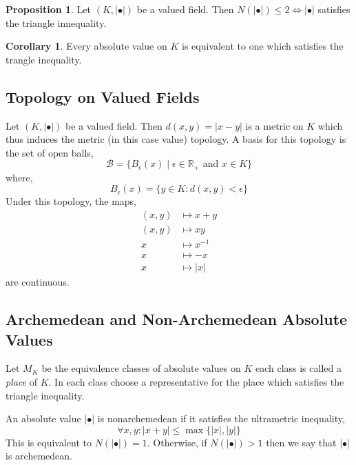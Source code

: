 \documentclass[12pt]{extarticle}
\newcommand{\R}{\mathbb{R}}
\theoremstyle{definition}
\newtheorem{proposition}[theorem]{Proposition}
\newtheorem{corollary}[theorem]{Corollary}
\newenvironment{definition}[1][Definition:]{\begin{trivlist}
\item[\hskip \labelsep {\bfseries #1}]}{\end{trivlist}}
\begin{document}
\begin{proposition}
Let $(K, |\bullet|)$ be a valued field. Then $N(| \bullet |) \le 2 \iff | \bullet |$ satisfies the triangle innequality.
\end{proposition}

\begin{corollary}
Every absolute value on $K$ is equivalent to one which satisfies the trangle inequality. 
\end{corollary}

\subsection{Topology on Valued Fields}

\begin{definition}
Let $(K, | \bullet |)$ be a valued field. Then $d(x, y) = | x - y|$ is a metric on $K$ which thus induces the metric (in this case value) topology. A basis for this topology is the set of open balls,
\[ \mathcal{B} = \{ B_\epsilon(x) \mid \epsilon \in \R_{+} \text{ and } x \in K \} \]
where,
\[ B_\epsilon(x) = \{ y \in K : d(x, y) < \epsilon \} \]
Under this topology, the maps,
\begin{align*}
(x, y) & \mapsto x + y
\\
(x, y) & \mapsto xy
\\
x & \mapsto x^{-1}
\\
x & \mapsto - x
\\
x & \mapsto |x|
\end{align*}
are continuous. 
\end{definition}

\subsection{Archemedean and Non-Archemedean Absolute Values}

\begin{definition}
Let $M_K$ be the equivalence classes of absolute values on $K$ each class is called a \textit{place} of $K$. In each class choose a representative for the place which satisfies the triangle inequality. 
\end{definition}

\begin{definition}
An absolute value $| \bullet |$ is nonarchemedean if it satisfies the ultrametric inequality,
\[ \forall x,y : |x + y| \le \max{\{ |x|, |y| \}} \]
This is equivalent to $N(| \bullet |) = 1$. Otherwise, if $N(| \bullet|) > 1$ then we say that $|\bullet|$ is archemedean. 
\end{definition}
\end{document}
